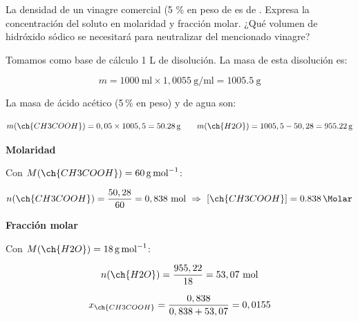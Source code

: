 \begin{exercise}
    La densidad de un vinagre comercial (5 \% en peso de  es de . Expresa la concentración del soluto en molaridad y fracción molar. ¿Qué volumen de hidróxido sódico  se necesitará para neutralizar  del mencionado vinagre?
    \begin{solu}

        Tomamos como base de cálculo 1 L de disolución. La masa de esta disolución es:

        \begin{equation*}
            m = 1000 \ \si{\milli\litre} \times 1,0055 \ \si{\gram\per\milli\litre} = \SI{1005.5}{\gram}
        \end{equation*}

        La masa de ácido acético (5\,\% en peso) y de agua son:

        \begin{equation*}
            m(\ch{CH3COOH}) = 0,05 \times 1005,5 = \SI{50.28}{\gram} \qquad m(\ch{H2O}) = 1005,5 - 50,28 = \SI{955.22}{\gram}
        \end{equation*}

        \textbf{Molaridad}

        Con \(M(\ch{CH3COOH}) = \SI{60}{\gram\per\mole}\):

        \begin{equation*}
            n(\ch{CH3COOH}) = \dfrac{50,28}{60} = 0,838 \ \text{mol} \ \Rightarrow \ [\ch{CH3COOH}] = \SI{0.838}{\Molar}
        \end{equation*}

        \textbf{Fracción molar}

        Con \(M(\ch{H2O}) = \SI{18}{\gram\per\mole}\):

        \begin{equation*}
            n(\ch{H2O}) = \dfrac{955,22}{18} = 53,07 \ \text{mol}
        \end{equation*}

        \begin{equation*}
            x_{\ch{CH3COOH}} = \dfrac{0,838}{0,838+53,07} = 0,0155
        \end{equation*}


\end{solu}
\end{exercise}

